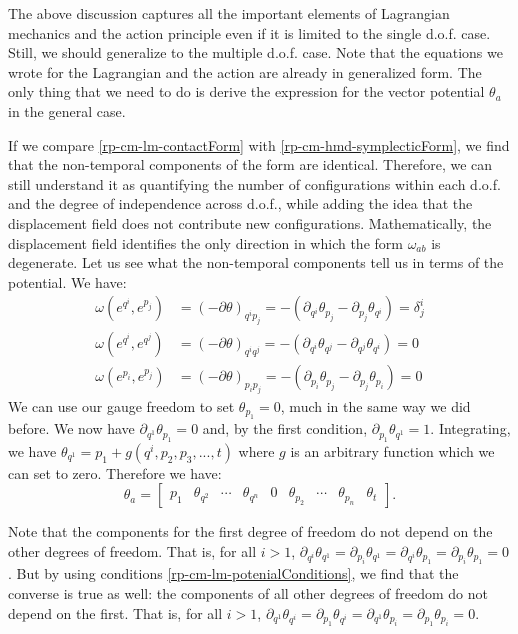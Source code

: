 The above discussion captures all the important elements of Lagrangian mechanics and the action principle even if it is limited to the single d.o.f. case. Still, we should generalize to the multiple d.o.f. case. Note that the equations we wrote for the Lagrangian and the action are already in generalized form. The only thing that we need to do is derive the expression for the vector potential $\theta_a$ in the general case.

If we compare \ref{rp-cm-lm-contactForm} with \ref{rp-cm-hmd-symplecticForm}, we find that the non-temporal components of the form are identical. Therefore, we can still understand it as quantifying the number of configurations within each d.o.f. and the degree of independence across d.o.f., while adding the idea that the displacement field does not contribute new configurations. Mathematically, the displacement field identifies the only direction in which the form $\omega_{ab}$ is degenerate. Let us see what the non-temporal components tell us in terms of the potential. We have:
\begin{equation}\label{rp-cm-lm-potenialConditions}
	\begin{aligned}
		\omega(e^{q^i}, e^{p_j}) &= (-\partial\theta)_{q^i p_j} = -(\partial_{q^i}\theta_{p_j} - \partial_{p_j}\theta_{q^i}) = \delta^i_j \\
		\omega(e^{q^i}, e^{q^j}) &= (-\partial\theta)_{q^i q^j} = -(\partial_{q^i}\theta_{q^j} - \partial_{q^j}\theta_{q^i}) = 0 \\
		\omega(e^{p_i}, e^{p_j}) &= (-\partial\theta)_{p_i p_j} = -(\partial_{p_i}\theta_{p_j} - \partial_{p_j}\theta_{p_i}) = 0
	\end{aligned}
\end{equation}
We can use our gauge freedom to set $\theta_{p_1} = 0$, much in the same way we did before. We now have $\partial_{q^1} \theta_{p_1} = 0$ and, by the first condition, $\partial_{p_1} \theta_{q^1} = 1$. Integrating, we have $\theta_{q^1} = p_1 + g(q^i, p_2, p_3, ..., t)$ where $g$ is an arbitrary function which we can set to zero. Therefore we have:
\begin{equation}
	\theta_a =  \begin{bmatrix}
		p_1 & \theta_{q^2} & \cdots & \theta_{q^n} & 0 & \theta_{p_2} & \cdots & \theta_{p_n} & \theta_{t}
	\end{bmatrix}. 
\end{equation}

Note that the components for the first degree of freedom do not depend on the other degrees of freedom. That is, for all $i>1$, $\partial_{q^i} \theta_{q^1} = \partial_{p_i} \theta_{q^1} = \partial_{q^i} \theta_{p_1} = \partial_{p_i} \theta_{p_1} = 0$. But by using conditions \ref{rp-cm-lm-potenialConditions}, we find that the converse is true as well: the components of all other degrees of freedom do not depend on the first. That is, for all $i>1$, $\partial_{q^1} \theta_{q^i} = \partial_{p_1} \theta_{q^i} = \partial_{q^1} \theta_{p_i} = \partial_{p_1} \theta_{p_i} = 0$.

